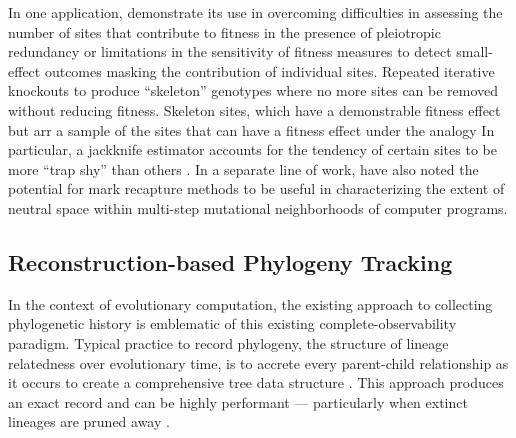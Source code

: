 In one application,  \citet{moreno2024methods} demonstrate its use in overcoming difficulties in assessing the number of sites that contribute to fitness in the presence of pleiotropic redundancy or limitations in the sensitivity of fitness measures to detect small-effect outcomes masking the contribution of individual sites.
Repeated iterative knockouts to produce ``skeleton'' genotypes where no more sites can be removed without reducing fitness.
Skeleton sites, which have a demonstrable fitness effect but arr a sample of the sites that can have a fitness effect under the analogy
In particular, a jackknife estimator accounts for the tendency of certain sites to be more ``trap shy'' than others \citep{TODO}.
In a separate line of work, \citet{schulte2014software} have also noted the potential for mark recapture methods to be useful in characterizing the extent of neutral space within multi-step mutational neighborhoods of computer programs.

\subsection{Reconstruction-based Phylogeny Tracking}

In the context of evolutionary computation, the existing approach to collecting phylogenetic history is emblematic of this existing complete-observability paradigm.
Typical practice to record phylogeny, the structure of lineage relatedness over evolutionary time, is to accrete every parent-child relationship as it occurs to create a comprehensive tree data structure \citep{moreno2024algorithms}.
This approach produces an exact record and can be highly performant --- particularly when extinct lineages are pruned away \citep{dolson2024phylotrackpy}.

